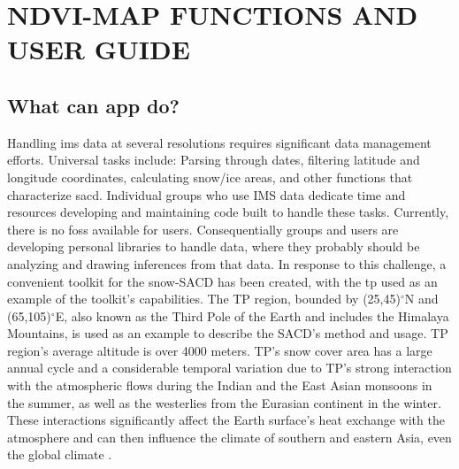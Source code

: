\chapter{NDVI-MAP FUNCTIONS AND USER GUIDE}
\label{chap:tibet}

\section{What can app do?}

Handling \acrfull{ims} data at several resolutions requires significant data management efforts. Universal tasks include: Parsing through dates, filtering latitude and longitude coordinates, calculating snow/ice areas, and other functions that characterize \acrfull{sacd}. Individual groups who use IMS data dedicate time and resources developing and maintaining code built to handle these tasks. Currently, there is no \acrfull{foss} available for users. Consequentially groups and users are developing personal libraries to handle data, where they probably should be analyzing and drawing inferences from that data. In response to this challenge, a convenient toolkit for the snow-SACD has been created, with the \acrfull{tp} used as an example of the toolkit's capabilities.
The TP region, bounded by (25,45)$^\circ$N and (65,105)$^\circ$E, also known as the Third Pole of the Earth and includes the Himalaya Mountains, is used as an example to describe the 
SACD's method and usage.
TP region's average altitude is over 4000 meters. TP's snow cover area has a large annual cycle and a considerable temporal variation due to TP's strong interaction with the atmospheric flows during the Indian and the East Asian monsoons in the summer, as well as the westerlies from the Eurasian continent in the winter.  These interactions significantly affect the Earth surface's heat exchange with the atmosphere and can then influence the climate of southern and eastern Asia, even the global climate \cite{yao2012different, yao2013review}. 
